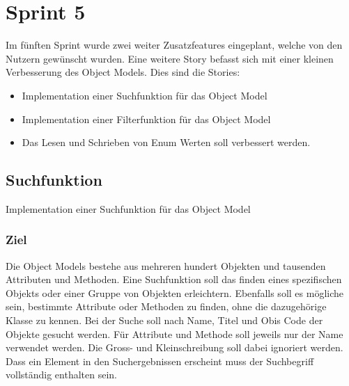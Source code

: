 \section{Sprint 5}
Im fünften Sprint wurde zwei weiter Zusatzfeatures eingeplant, welche von den Nutzern gewünscht wurden.
Eine weitere Story befasst sich mit einer kleinen Verbesserung des Object Models.
Dies sind die Stories:
\begin{itemize}
   \item Implementation einer Suchfunktion für das Object Model
   \item Implementation einer Filterfunktion für das Object Model
   \item Das Lesen und Schrieben von Enum Werten soll verbessert werden.
\end{itemize}

\subsection{Suchfunktion}
\dq Implementation einer Suchfunktion für das Object Model\dq
\subsubsection{Ziel}
Die Object Models bestehe aus mehreren hundert Objekten und tausenden Attributen und Methoden.
Eine Suchfunktion soll das finden eines spezifischen Objekts oder einer Gruppe von Objekten erleichtern.
Ebenfalls soll es mögliche sein, bestimmte Attribute oder Methoden zu finden, ohne die dazugehörige Klasse zu kennen.
Bei der Suche soll nach Name, Titel und Obis Code der Objekte gesucht werden.
Für Attribute und Methode soll jeweils nur der Name verwendet werden.
Die Gross- und Kleinschreibung soll dabei ignoriert werden.
Dass ein Element in den Suchergebnissen erscheint muss der Suchbegriff vollständig enthalten sein.

